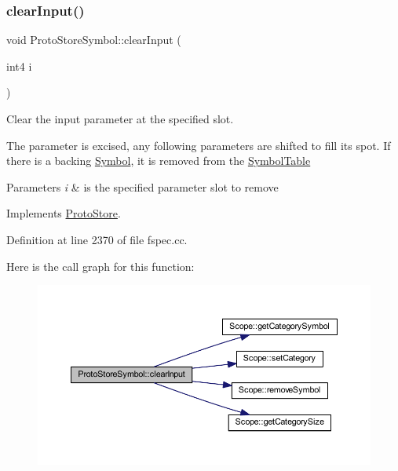 \subsubsection{\texorpdfstring{clearInput()}{clearInput()}}
{\footnotesize\ttfamily void Proto\+Store\+Symbol\+::clear\+Input (\begin{DoxyParamCaption}\item[{int4}]{i }\end{DoxyParamCaption})\hspace{0.3cm}{\ttfamily [virtual]}}



Clear the input parameter at the specified slot. 

The parameter is excised, any following parameters are shifted to fill its spot. If there is a backing \mbox{\hyperlink{class_symbol}{Symbol}}, it is removed from the \mbox{\hyperlink{class_symbol_table}{Symbol\+Table}} 
\begin{DoxyParams}{Parameters}
{\em i} & is the specified parameter slot to remove \\
\hline
\end{DoxyParams}


Implements \mbox{\hyperlink{class_proto_store_afa6361ac313cdd2ccef1531209389cdc}{Proto\+Store}}.



Definition at line 2370 of file fspec.\+cc.

Here is the call graph for this function\+:
\nopagebreak
\begin{figure}[H]
\begin{center}
\leavevmode
\includegraphics[width=350pt]{class_proto_store_symbol_aa36f84c14205c90e18708858a3ae4ae5_cgraph}
\end{center}
\end{figure}
\mbox{\label{class_proto_store_symbol_aadbd3a9fba172e28405eeb0001292bff}} 
